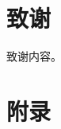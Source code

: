 \documentclass{EvilStyle}
\begin{document}







\section*{致谢}

致谢内容。


\nocite{*}






\appendix

\section{附录}
\end{document}
